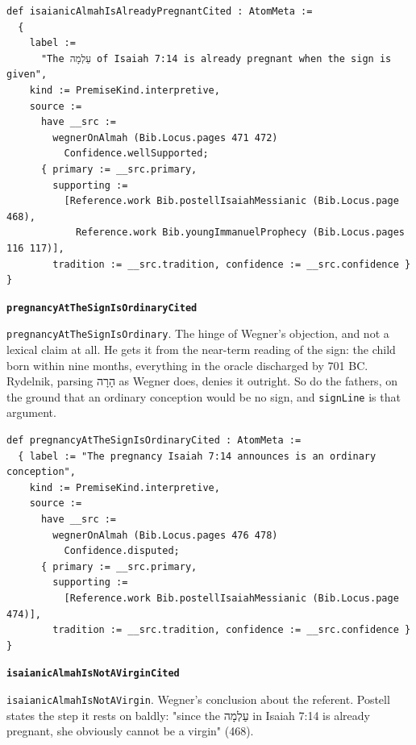 \documentclass[11pt]{article}
\begin{document}
{\small\begin{verbatim}
def isaianicAlmahIsAlreadyPregnantCited : AtomMeta :=
  {
    label :=
      "The עַלְמָה of Isaiah 7:14 is already pregnant when the sign is given",
    kind := PremiseKind.interpretive,
    source :=
      have __src :=
        wegnerOnAlmah (Bib.Locus.pages 471 472)
          Confidence.wellSupported;
      { primary := __src.primary,
        supporting :=
          [Reference.work Bib.postellIsaiahMessianic (Bib.Locus.page 468),
            Reference.work Bib.youngImmanuelProphecy (Bib.Locus.pages 116 117)],
        tradition := __src.tradition, confidence := __src.confidence } }
\end{verbatim}}
\par\medskip\noindent\textbf{\texttt{pregnancy\allowbreak{}At\allowbreak{}The\allowbreak{}Sign\allowbreak{}Is\allowbreak{}Ordinary\allowbreak{}Cited}}\par\nobreak\noindent
\texttt{pregnancy\allowbreak{}At\allowbreak{}The\allowbreak{}Sign\allowbreak{}Is\allowbreak{}Ordinary}. The hinge of Wegner's objection, and not a lexical claim at all. He gets it from the near-term reading of the sign: the child born within nine months, everything in the oracle discharged by 701 BC. Rydelnik, parsing הָרָה as Wegner does, denies it outright. So do the fathers, on the ground that an ordinary conception would be no sign, and \texttt{sign\allowbreak{}Line} is that argument.

{\small\begin{verbatim}
def pregnancyAtTheSignIsOrdinaryCited : AtomMeta :=
  { label := "The pregnancy Isaiah 7:14 announces is an ordinary conception",
    kind := PremiseKind.interpretive,
    source :=
      have __src :=
        wegnerOnAlmah (Bib.Locus.pages 476 478)
          Confidence.disputed;
      { primary := __src.primary,
        supporting :=
          [Reference.work Bib.postellIsaiahMessianic (Bib.Locus.page 474)],
        tradition := __src.tradition, confidence := __src.confidence } }
\end{verbatim}}
\par\medskip\noindent\textbf{\texttt{isaianic\allowbreak{}Almah\allowbreak{}Is\allowbreak{}Not\allowbreak{}AVirgin\allowbreak{}Cited}}\par\nobreak\noindent
\texttt{isaianic\allowbreak{}Almah\allowbreak{}Is\allowbreak{}Not\allowbreak{}AVirgin}. Wegner's conclusion about the referent. Postell states the step it rests on baldly: "since the עַלְמָה in Isaiah 7:14 is already pregnant, she obviously cannot be a virgin" (468).
\end{document}
